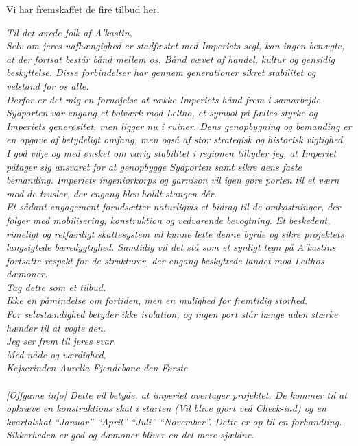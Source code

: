 \documentclass[letterpaper,12pt]{memoir}
\newenvironment{pullquote}
  {\begin{tcolorbox}[enhanced, breakable]\itshape\large}
  {\end{tcolorbox}}
\begin{document}
Vi har fremskaffet de fire tilbud her.
\begin{pullquote}
Til det ærede folk af A’kastin,\\
Selv om jeres uafhængighed er stadfæstet med Imperiets segl, kan ingen benægte, at der fortsat består bånd mellem os. Bånd vævet af handel, kultur og gensidig beskyttelse. Disse forbindelser har gennem generationer sikret stabilitet og velstand for os alle.\\
Derfor er det mig en fornøjelse at række Imperiets hånd frem i samarbejde.\\
Sydporten var engang et bolværk mod Leltho, et symbol på fælles styrke og Imperiets generøsitet, men ligger nu i ruiner. Dens genopbygning og bemanding er en opgave af betydeligt omfang, men også af stor strategisk og historisk vigtighed.
I god vilje og med ønsket om varig stabilitet i regionen tilbyder jeg, at Imperiet påtager sig ansvaret for at genopbygge Sydporten samt sikre dens faste bemanding. Imperiets ingeniørkorps og garnison vil igen gøre porten til et værn mod de trusler, der engang blev holdt stangen dér.\\
Et sådant engagement forudsætter naturligvis et bidrag til de omkostninger, der følger med mobilisering, konstruktion og vedvarende bevogtning. Et beskedent, rimeligt og retfærdigt skattesystem vil kunne lette denne byrde og sikre projektets langsigtede bæredygtighed. Samtidig vil det stå som et synligt tegn på A’kastins fortsatte respekt for de strukturer, der engang beskyttede landet mod Lelthos dæmoner.\\
Tag dette som et tilbud.\\
 Ikke en påmindelse om fortiden, men en mulighed for fremtidig storhed.\\
For selvstændighed betyder ikke isolation, og ingen port står længe uden stærke hænder til at vogte den.\\
Jeg ser frem til jeres svar.\\
Med nåde og værdighed,\\
 Kejserinden Aurelia Fjendebane den Første\\
 \\[3\baselineskip]
[Offgame info] Dette vil betyde, at imperiet overtager projektet. De kommer til at opkræve en konstruktions skat i starten (Vil blive gjort ved Check-ind) og en kvartalskat “Januar” “April” “Juli” “November”. Dette er op til en forhandling. Sikkerheden er god og dæmoner bliver en del mere sjældne.\\
\end{pullquote}
\end{document}
